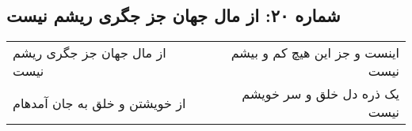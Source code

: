 \begin{center}
\section*{شماره ۲۰: از مال جهان جز جگری ریشم نیست}
\label{sec:020}
\begin{longtable}{l p{0.5cm} r}
از مال جهان جز جگری ریشم نیست
&&
اینست و جز این هیچ کم و بیشم نیست
\\
از خویشتن و خلق به جان آمدهام
&&
یک ذره دل خلق و سر خویشم نیست
\\
\end{longtable}
\end{center}
